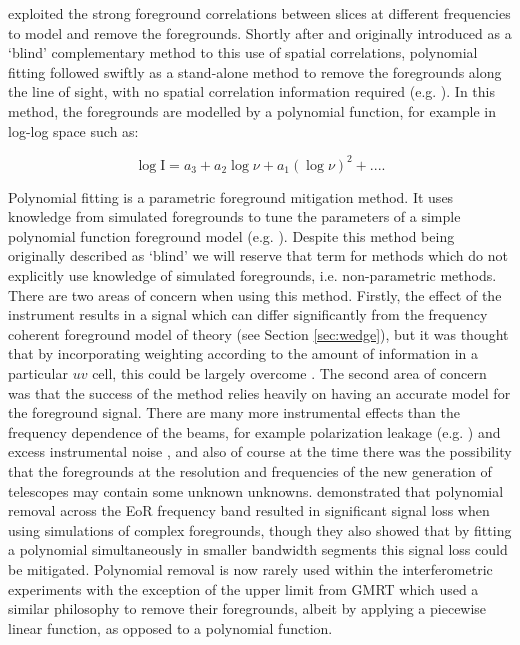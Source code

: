 \citep{Santos2005ApJ...625..575S,Zal2004ApJ...608..622Z} exploited the strong foreground correlations between slices at different frequencies to model and remove the foregrounds. Shortly after and originally introduced as a `blind' complementary method to this use of spatial correlations, polynomial fitting followed swiftly as a stand-alone method to remove the foregrounds along the line of sight, with no spatial correlation information required (e.g. \citet{Bowman2009ApJ...695..183B,Wang2006ApJ...650..529W,Mcquinn2006ApJ...653..815M}). In this method, the foregrounds are modelled by a polynomial function, for example in log-log space such as:

\begin{equation}
\mathrm{\log I} = a_3 +a_2\log\nu + a_1(\log \nu)^2 + ....
\end{equation}

Polynomial fitting is a parametric foreground mitigation method. It uses knowledge from simulated foregrounds to tune the parameters of a simple polynomial function foreground model (e.g. \citet{Jelic2008MNRAS.389.1319J}). Despite this method being originally described as `blind' we will reserve that term for methods which do not explicitly use knowledge of simulated foregrounds, i.e. non-parametric methods. There are two areas of concern when using this method. Firstly, the effect of the instrument results in a signal which can differ significantly from the frequency coherent foreground model of theory (see Section \ref{sec:wedge}), but it was thought that by incorporating weighting according to the amount of information in a particular $uv$ cell, this could be largely overcome \citep{Liu2009MNRAS.398..401L,Bowman2009ApJ...695..183B}. The second area of concern was that the success of the method relies heavily on having an accurate model for the foreground signal. There are many more instrumental effects than the frequency dependence of the beams, for example polarization leakage (e.g. \citet{Nunhokee2017ApJ...848...47N,Asad2015MNRAS.451.3709A}) and excess instrumental noise \citep{Patil2016MNRAS.463.4317P}, and also of course at the time there was the possibility that the foregrounds at the resolution and frequencies of the new generation of telescopes may contain some unknown unknowns. \citet{Wang2013ApJ...763...90W} demonstrated that polynomial removal across the EoR frequency band resulted in significant signal loss when using simulations of complex foregrounds, though they also showed that by fitting a polynomial simultaneously in smaller bandwidth segments this signal loss could be mitigated. Polynomial removal is now rarely used within the interferometric experiments with the exception of the upper limit from GMRT \citep{Paciga2011MNRAS.413.1174P} which used a similar philosophy to remove their foregrounds, albeit by applying a piecewise linear function, as opposed to a polynomial function. 

